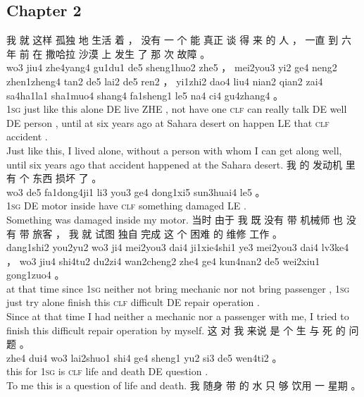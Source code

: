 \documentclass[UTF8]{ctexart}
\begin{document}
\newpage 

\subsection*{Chapter 2}
\begin{exe}
\ex
\glll
我 就 这样 孤独 地 生活 着 ， 没有 一 个 能 真正 谈 得 来 的 人 ， 一直 到 六 年 前 在 撒哈拉 沙漠 上 发生 了 那 次 故障 。
\\
wo3 jiu4 zhe4yang4 gu1du1 de5 sheng1huo2 zhe5 ， mei2you3 yi2 ge4 neng2 zhen1zheng4 tan2 de5 lai2 de5 ren2 ， yi1zhi2 dao4 liu4 nian2 qian2 zai4 sa4ha1la1 sha1muo4 shang4 fa1sheng1 le5 na4 ci4 gu4zhang4 。
\\
\textsc{1sg} just {like this} alone DE live ZHE , {not have} one \textsc{clf} can really talk DE {well} DE person , until at six years ago at Sahara desert on happen LE that \textsc{clf} accident . 
\\
\trans Just like this, I lived alone, without a person with whom I can get along well, until six years ago that accident happened at the Sahara desert. 
\ex
\glll
我 的 发动机 里 有 个 东西 损坏 了 。
\\
wo3 de5 fa1dong4ji1 li3 you3 ge4 dong1xi5 sun3huai4 le5 。
\\
\textsc{1sg} DE motor inside have \textsc{clf} something damaged LE .
\\
\trans Something was damaged inside my motor. 
\ex
\glll
当时 由于 我 既 没有 带 机械师 也 没有 带 旅客 ， 我 就 试图 独自 完成 这 个 困难 的 维修 工作 。
\\
dang1shi2 you2yu2 wo3 ji4 mei2you3 dai4 ji1xie4shi1 ye3 mei2you3 dai4 lv3ke4 ， wo3 jiu4 shi4tu2 du2zi4 wan2cheng2 zhe4 ge4 kun4nan2 de5 wei2xiu1 gong1zuo4 。
\\
{at that time} since \textsc{1sg} neither not bring mechanic nor not bring passenger , \textsc{1sg} just try alone finish this \textsc{clf} difficult DE repair operation .
\\
\trans Since at that time I had neither a mechanic nor a passenger with me, I tried to finish this difficult repair operation by myself. 
\ex
\glll
这 对 我 来说 是 个 生 与 死 的 问题 。
\\
zhe4 dui4 wo3 lai2shuo1 shi4 ge4 sheng1 yu2 si3 de5 wen4ti2 。
\\
this for \textsc{1sg} {} is \textsc{clf} life and death DE question .
\\
\trans To me this is a question of life and death. 
\ex
\glll
我 随身 带 的 水 只 够 饮用 一 星期 。
\\

\end{exe}
\end{document}

